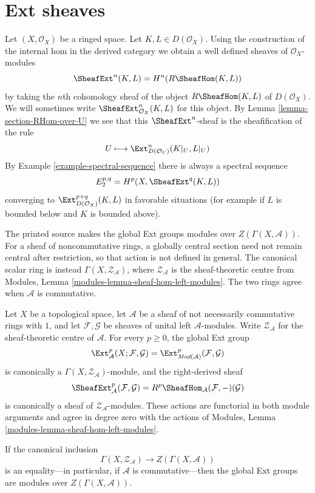 \section{Ext sheaves}
\label{section-ext}

\noindent
Let $(X, \mathcal{O}_X)$ be a ringed space. Let $K, L \in D(\mathcal{O}_X)$.
Using the construction of the internal hom in the derived category we
obtain a well defined sheaves of $\mathcal{O}_X$-modules
$$
\SheafExt^n(K, L) = H^n(R\SheafHom(K, L))
$$
by taking the $n$th cohomology sheaf of the object $R\SheafHom(K, L)$
of $D(\mathcal{O}_X)$. We will sometimes write
$\SheafExt^n_{\mathcal{O}_X}(K, L)$ for this object.
By Lemma \ref{lemma-section-RHom-over-U}
we see that this $\SheafExt^n$-sheaf
is the sheafification of the rule
$$
U \longmapsto \Ext^n_{D(\mathcal{O}_U)}(K|_U, L|_U)
$$
By Example \ref{example-spectral-sequence} there is always a spectral
sequence
$$
E_2^{p, q} = H^p(X, \SheafExt^q(K, L))
$$
converging to $\Ext^{p + q}_{D(\mathcal{O}_X)}(K, L)$
in favorable situations (for example if $L$ is bounded below and
$K$ is bounded above).

\begin{lemma}
\label{lemma-ext-center-actions-left-modules}
\begin{reference}
\cite[Chapter IV, \S 4.2, p. 188]{Tohoku}
\end{reference}
\begin{history}
The printed source makes the global Ext groups modules over
$Z(\Gamma(X,\mathcal A))$. For a sheaf of noncommutative rings, a globally
central section need not remain central after restriction, so that action is
not defined in general. The canonical scalar ring is instead
$\Gamma(X,\mathcal Z_{\mathcal A})$, where
$\mathcal Z_{\mathcal A}$ is the sheaf-theoretic centre from Modules, Lemma
\ref{modules-lemma-sheaf-hom-left-modules}. The two rings agree when
$\mathcal A$ is commutative.
\end{history}
Let $X$ be a topological space, let $\mathcal A$ be a sheaf of not
necessarily commutative rings with $1$, and let $\mathcal F,\mathcal G$ be
sheaves of unital left $\mathcal A$-modules. Write
$\mathcal Z_{\mathcal A}$ for the sheaf-theoretic centre of $\mathcal A$.
For every $p\geq0$, the global Ext group
\[
\Ext^p_{\mathcal A}(X;\mathcal F,\mathcal G)
=
\Ext^p_{\textit{Mod}(\mathcal A)}(\mathcal F,\mathcal G)
\]
is canonically a $\Gamma(X,\mathcal Z_{\mathcal A})$-module, and the
right-derived sheaf
\[
\SheafExt^p_{\mathcal A}(\mathcal F,\mathcal G)
=
R^p\SheafHom_{\mathcal A}(\mathcal F,-)(\mathcal G)
\]
is canonically a sheaf of $\mathcal Z_{\mathcal A}$-modules. These actions
are functorial in both module arguments and agree in degree zero with the
actions of Modules, Lemma
\ref{modules-lemma-sheaf-hom-left-modules}.

If the canonical inclusion
\[
\Gamma(X,\mathcal Z_{\mathcal A})
\longrightarrow Z(\Gamma(X,\mathcal A))
\]
is an equality---in particular, if $\mathcal A$ is commutative---then the
global Ext groups are modules over $Z(\Gamma(X,\mathcal A))$.
\end{lemma}

